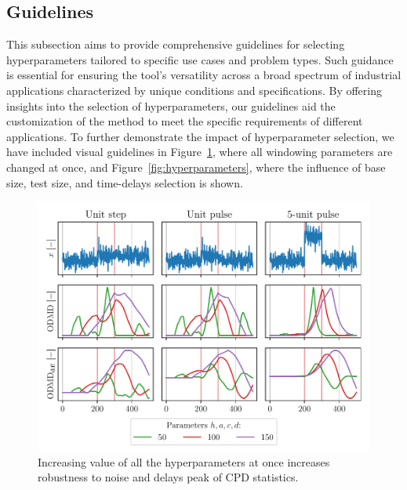 \subsection{Guidelines}\label{sec:guidelines}
This subsection aims to provide comprehensive guidelines for selecting hyperparameters tailored to specific use cases and problem types. Such guidance is essential for ensuring the tool's versatility across a broad spectrum of industrial applications characterized by unique conditions and specifications. By offering insights into the selection of hyperparameters, our guidelines aid the customization of the method to meet the specific requirements of different applications. To further demonstrate the impact of hyperparameter selection, we have included visual guidelines in Figure~\ref{fig:hyperparameters-all}, where all windowing parameters are changed at once, and Figure~\ref{fig:hyperparameters}, where the influence of base size, test size, and time-delays selection is shown.
\begin{figure}[H]
	\centering
	\includegraphics[width=\linewidth]{figures/parameters-influence-allatonce.pdf}
	\caption{Increasing value of all the hyperparameters at once increases robustness to noise and delays peak of CPD statistics.}\label{fig:hyperparameters-all}
\end{figure}

